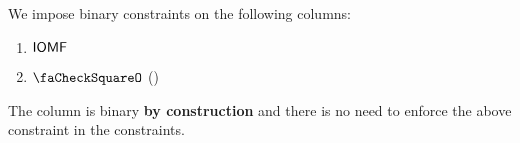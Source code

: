 We impose binary constraints on the following columns:
\begin{multicols}{2}
	\begin{enumerate}
		\item $\textsf{IOMF}$
		\item $\done$ \quad (\trash)
	\end{enumerate}
\end{multicols}
\saNote{} The \done{} column is binary \textbf{by construction} and there is no need to enforce the above constraint in the constraints.
